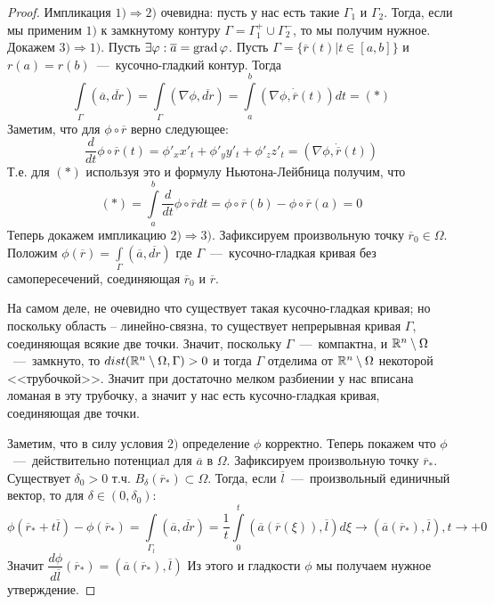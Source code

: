 \begin{proof}
    Импликация $1) \Rightarrow 2)$ очевидна: пусть у нас есть такие $\Gamma_1$ и $\Gamma_2$. Тогда, если мы применим $1)$ к замкнутому контуру $\Gamma = \Gamma_1^+ \cup \Gamma_2^-$, то мы получим нужное. \\
    Докажем $3) \Rightarrow 1)$. Пусть $\exists \varphi: \overline{a} = \operatorname{grad} \varphi$. Пусть $\Gamma = \{\overline{r}(t) | t \in [a, b]\}$ и $r(a) = r(b)$~---~кусочно-гладкий контур. Тогда \[\int\limits_\Gamma (\overline{a}, \overline{dr}) = \int\limits_\Gamma (\nabla \phi, \overline{dr}) = \int\limits_a^b (\nabla \phi, \dot{\overline{r}}(t)) dt = (*)\]
    Заметим, что для $\phi \circ \overline{r}$ верно следующее: \[\dfrac{d}{dt}\phi \circ \overline{r}(t) = \phi'_xx'_t + \phi'_yy'_t + \phi'_zz'_t = (\nabla \phi, \dot{\overline{r}}(t))\]
    Т.е. для $(*)$ используя это и формулу Ньютона-Лейбница получим, что \[(*) = \int\limits_a^b \dfrac{d}{dt} \phi \circ \overline{r} dt = \phi \circ \overline{r}(b) - \phi \circ \overline{r}(a) = 0\]
    Теперь докажем импликацию $2) \Rightarrow 3)$. Зафиксируем произвольную точку $\overline{r}_0 \in \Omega$. Положим $\phi(\overline{r}) = \int\limits_\Gamma (\overline{a}, \overline{dr})$ где $\Gamma$~---~кусочно-гладкая кривая без самопересечений, соединяющая $\overline{r}_0$ и $\overline{r}$. 
    \begin{note}
        На самом деле, не очевидно что существует такая кусочно-гладкая кривая; но поскольку область -- линейно-связна, то существует непрерывная кривая $\Gamma$, соединяющая всякие две точки. Значит, поскольку $\Gamma$~---~компактна, и $\mathbb{R}^n \setminus \Omega$~---~замкнуто, то $dist(\mathbb{R}^n \setminus \Omega, \Gamma) > 0$ и тогда $\Gamma$ отделима от $\mathbb{R}^n \setminus \Omega$ некоторой <<трубочкой>>. Значит при достаточно мелком разбиении у нас вписана ломаная в эту трубочку, а значит у нас есть кусочно-гладкая кривая, соединяющая две точки.
    \end{note}
    Заметим, что в силу условия $2)$ определение $\phi$ корректно. Теперь покажем что $\phi$~---~действительно потенциал для $\overline{a}$ в $\Omega$. Зафиксируем произвольную точку $\overline{r}_*$. Существует $\delta_0 > 0$ т.ч. $B_\delta(\overline{r}_*) \subset \Omega$.
    Тогда, если $\overline{l}$~---~произвольный единичный вектор, то для $\delta \in (0, \delta_0)$: \[\phi(\overline{r}_* + t \overline{l}) - \phi(\overline{r}_*) = \int\limits_{\Gamma_l} 
    (\overline{a}, \overline{dr}) = \dfrac{1}{t}\int\limits_0^t (\overline{a}(\overline{r}(\xi)), \overline{l})d\xi \rightarrow (\overline{a}(\overline{r}_*), \overline{l}), t \rightarrow +0\]
    Значит $\dfrac{d\phi}{d\overline{l}}(\overline{r}_*) = (\overline{a}(\overline{r}_*), \overline{l})$
    Из этого и гладкости $\phi$ мы получаем нужное утверждение.
\end{proof}
